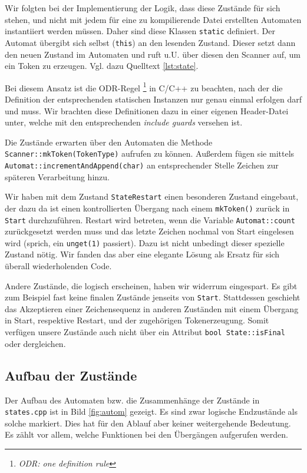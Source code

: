 \documentclass[
a4paper,   %
11pt,      %
oneside,   %
onecolumn, %
final      %
]{article}
\newcommand{\code}[1]{\lstinline$#1$}
\begin{document}
Wir folgten bei der Implementierung der Logik, dass diese Zustände für sich stehen, und nicht mit jedem für eine zu kompilierende Datei erstellten Automaten instantiiert werden müssen.
Daher sind diese Klassen \code{static} definiert. Der Automat übergibt sich selbst (\code{this}) an den lesenden Zustand.
Dieser setzt dann den neuen Zustand im Automaten und ruft u.U. über diesen den Scanner auf, um ein Token zu erzeugen.
Vgl. dazu Quelltext \ref{lst:state}.

Bei diesem Ansatz ist die ODR-Regel \footnote{\emph{ODR: one definition rule}} in C/C++ zu beachten, nach der die Definition der entsprechenden statischen Instanzen nur genau einmal erfolgen darf und muss.
Wir brachten diese Definitionen dazu in einer eigenen Header-Datei unter, welche mit den entsprechenden \emph{include guards} versehen ist.

Die Zustände erwarten über den Automaten die Methode \code{Scanner::mkToken(TokenType)} aufrufen zu können.
Außerdem fügen sie mittels \code{Automat::incrementAndAppend(char)} an entsprechender Stelle Zeichen zur späteren Verarbeitung hinzu.

Wir haben mit dem Zustand \texttt{StateRestart} einen besonderen Zustand eingebaut, der dazu da ist einen kontrollierten Übergang nach einem \code{mkToken()} zurück in \texttt{Start} durchzuführen.
Restart wird betreten, wenn die Variable \code{Automat::count} zurückgesetzt werden muss und das letzte Zeichen nochmal von Start eingelesen wird (sprich, ein \code{unget(1)} passiert).
Dazu ist nicht unbedingt dieser spezielle Zustand nötig.
Wir fanden das aber eine elegante Lösung als Ersatz für sich überall wiederholenden Code.

Andere Zustände, die logisch erscheinen, haben wir widerrum eingespart.
Es gibt zum Beispiel fast keine finalen Zustände jenseits von \texttt{Start}.
Stattdessen geschieht das Akzeptieren einer Zeichensequenz in anderen Zuständen mit einem Übergang in Start, respektive Restart, und der zugehörigen Tokenerzeugung. Somit verfügen unsere Zustände auch nicht über ein Attribut \code{bool State::isFinal} oder dergleichen.

\subsection{Aufbau der Zustände}

Der Aufbau des Automaten bzw. die Zusammenhänge der Zustände in \texttt{states.cpp} ist in Bild \ref{fig:autom} gezeigt. Es sind zwar logische Endzustände als solche markiert. Dies hat für den Ablauf aber keiner weitergehende Bedeutung. Es zählt vor allem, welche Funktionen bei den Übergängen aufgerufen werden.
\end{document}
